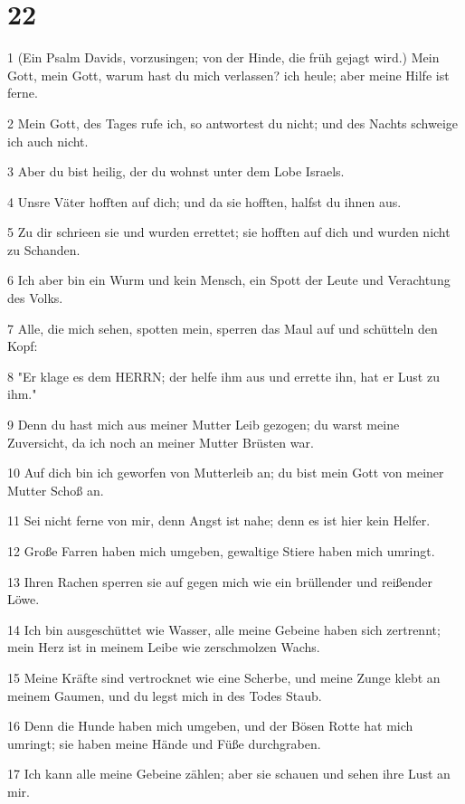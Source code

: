 \chapter{22}

\par 1 (Ein Psalm Davids, vorzusingen; von der Hinde, die früh gejagt wird.) Mein Gott, mein Gott, warum hast du mich verlassen? ich heule; aber meine Hilfe ist ferne.
\par 2 Mein Gott, des Tages rufe ich, so antwortest du nicht; und des Nachts schweige ich auch nicht.
\par 3 Aber du bist heilig, der du wohnst unter dem Lobe Israels.
\par 4 Unsre Väter hofften auf dich; und da sie hofften, halfst du ihnen aus.
\par 5 Zu dir schrieen sie und wurden errettet; sie hofften auf dich und wurden nicht zu Schanden.
\par 6 Ich aber bin ein Wurm und kein Mensch, ein Spott der Leute und Verachtung des Volks.
\par 7 Alle, die mich sehen, spotten mein, sperren das Maul auf und schütteln den Kopf:
\par 8 "Er klage es dem HERRN; der helfe ihm aus und errette ihn, hat er Lust zu ihm."
\par 9 Denn du hast mich aus meiner Mutter Leib gezogen; du warst meine Zuversicht, da ich noch an meiner Mutter Brüsten war.
\par 10 Auf dich bin ich geworfen von Mutterleib an; du bist mein Gott von meiner Mutter Schoß an.
\par 11 Sei nicht ferne von mir, denn Angst ist nahe; denn es ist hier kein Helfer.
\par 12 Große Farren haben mich umgeben, gewaltige Stiere haben mich umringt.
\par 13 Ihren Rachen sperren sie auf gegen mich wie ein brüllender und reißender Löwe.
\par 14 Ich bin ausgeschüttet wie Wasser, alle meine Gebeine haben sich zertrennt; mein Herz ist in meinem Leibe wie zerschmolzen Wachs.
\par 15 Meine Kräfte sind vertrocknet wie eine Scherbe, und meine Zunge klebt an meinem Gaumen, und du legst mich in des Todes Staub.
\par 16 Denn die Hunde haben mich umgeben, und der Bösen Rotte hat mich umringt; sie haben meine Hände und Füße durchgraben.
\par 17 Ich kann alle meine Gebeine zählen; aber sie schauen und sehen ihre Lust an mir.
